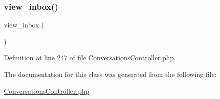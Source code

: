 \mbox{\label{class_responsive_1_1_http_1_1_controllers_1_1_conversations_controller_aecbd262429c2f29323f987e3dfb7492e}} 
\subsubsection{\texorpdfstring{view\_inbox()}{view\_inbox()}}
{\footnotesize\ttfamily view\+\_\+inbox (\begin{DoxyParamCaption}{ }\end{DoxyParamCaption})}



Definition at line 247 of file Conversations\+Controller.\+php.



The documentation for this class was generated from the following file\+:\begin{DoxyCompactItemize}
\item 
\mbox{\hyperlink{_conversations_controller_8php}{Conversations\+Controller.\+php}}\end{DoxyCompactItemize}
